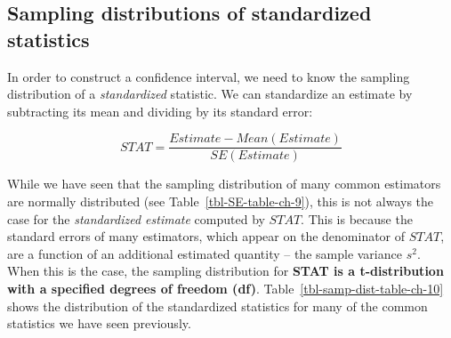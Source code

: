 \documentclass[
  letterpaper,
  DIV=11,
  numbers=noendperiod]{scrreprt}
\theoremstyle{definition}
\theoremstyle{remark}
\begin{document}
\hypertarget{sampling-distributions-of-standardized-statistics}{%
\subsection{Sampling distributions of standardized
statistics}\label{sampling-distributions-of-standardized-statistics}}

In order to construct a confidence interval, we need to know the
sampling distribution of a \emph{standardized} statistic. We can
standardize an estimate by subtracting its mean and dividing by its
standard error:

\[STAT = \frac{Estimate - Mean(Estimate)}{SE(Estimate)}\]

While we have seen that the sampling distribution of many common
estimators are normally distributed (see Table~\ref{tbl-SE-table-ch-9}),
this is not always the case for the \emph{standardized estimate}
computed by \(STAT\). This is because the standard errors of many
estimators, which appear on the denominator of \(STAT\), are a function
of an additional estimated quantity -- the sample variance \(s^2\). When
this is the case, the sampling distribution for \textbf{STAT is a
t-distribution with a specified degrees of freedom (df)}.
Table~\ref{tbl-samp-dist-table-ch-10} shows the distribution of the
standardized statistics for many of the common statistics we have seen
previously.
\end{document}
